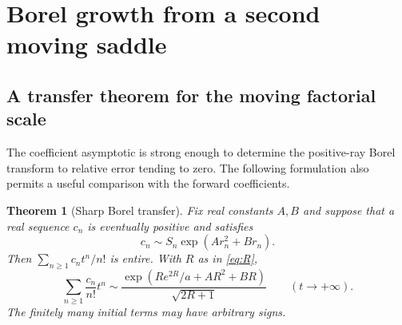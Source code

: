 \documentclass[11pt,a4paper]{article}
\numberwithin{equation}{section}
\newtheorem{theorem}{Theorem}[section]
\theoremstyle{definition}
\theoremstyle{remark}
\begin{document}
\section{Borel growth from a second moving saddle}
\label{sec:borel}

\subsection{A transfer theorem for the moving factorial scale}

The coefficient asymptotic is strong enough to determine the positive-ray
Borel transform to relative error tending to zero. The following formulation
also permits a useful comparison with the forward coefficients.

\begin{theorem}[Sharp Borel transfer]
\label{thm:borel-transfer}
Fix real constants $A,B$ and suppose that a real sequence $c_n$ is eventually
positive and satisfies
\begin{equation}
 c_n\sim S_n\exp(A r_n^2+B r_n).
 \label{eq:general-sequence}
\end{equation}
Then $\sum_{n\ge1}c_nt^n/n!$ is entire. With $R$ as in \eqref{eq:R},
\begin{equation}
 \sum_{n\ge1}\frac{c_n}{n!}t^n
 \sim\frac{\exp\!\left(R e^{2R}/a+A R^2+B R\right)}{\sqrt{2R+1}}
 \qquad(t\to+\infty).
 \label{eq:borel-transfer}
\end{equation}
The finitely many initial terms may have arbitrary signs.
\end{theorem}
\end{document}
